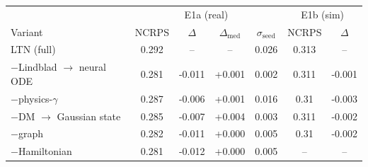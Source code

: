 \begin{tabular}{lcccc|cc}
\toprule
 & \multicolumn{4}{c|}{E1a (real)} & \multicolumn{2}{c}{E1b (sim)} \\
Variant & NCRPS & $\Delta$ & $\Delta_{\mathrm{med}}$ & $\sigma_{\mathrm{seed}}$ & NCRPS & $\Delta$ \\
\midrule
LTN (full) & 0.292 & -- & -- & 0.026 & 0.313 & -- \\
$-$Lindblad $\to$ neural ODE & 0.281 & -0.011 & +0.001 & 0.002 & 0.311 & -0.001 \\
$-$physics-$\gamma$ & 0.287 & -0.006 & +0.001 & 0.016 & 0.31 & -0.003 \\
$-$DM $\to$ Gaussian state & 0.285 & -0.007 & +0.004 & 0.003 & 0.311 & -0.002 \\
$-$graph & 0.282 & -0.011 & +0.000 & 0.005 & 0.31 & -0.002 \\
$-$Hamiltonian & 0.281 & -0.012 & +0.000 & 0.005 & -- & -- \\
\bottomrule
\end{tabular}
